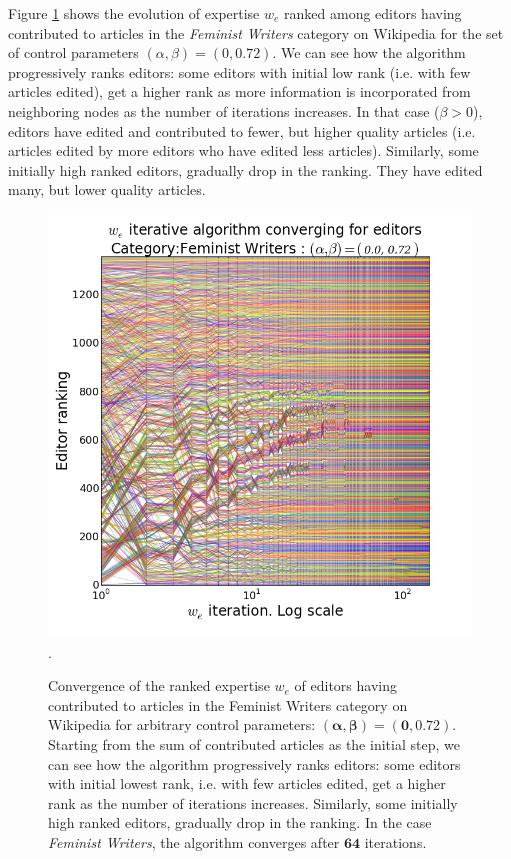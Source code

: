 Figure \ref{fig:convergence} shows the evolution of expertise $w_e$ ranked among editors having contributed to articles in the {\it Feminist Writers} category on Wikipedia for the set of control parameters $(\alpha,\beta) =(0, 0.72)$. We can see how the algorithm progressively ranks editors: some editors with initial low rank (i.e. with few articles edited), get a higher rank as more information is incorporated from neighboring nodes as the number of iterations increases. In that case ($\beta >0$), editors have edited and contributed to fewer, but higher quality articles (i.e. articles edited by more editors who have edited less articles). Similarly, some initially high ranked editors, gradually drop in the ranking. They have edited many, but lower quality articles. 

\begin{figure}[!t]
\centering
\includegraphics[width=0.9\columnwidth]{../Figures/fem_editors_iter_converge.png}.
\caption{Convergence of the ranked expertise $w_e$ of editors having contributed to articles in the Feminist Writers category on Wikipedia for arbitrary control parameters: $\mathbf{(\alpha,\beta) =(0, 0.72)}$. Starting from the sum of contributed articles as the initial step, we can see how the algorithm progressively ranks editors: some editors with initial lowest rank, i.e. with few articles edited, get a higher rank as the number of iterations increases. Similarly, some initially high ranked editors, gradually drop in the ranking. In the case {\it Feminist Writers}, the algorithm converges after $\mathbf{64}$ iterations.}
\label{fig:convergence}
\end{figure}

